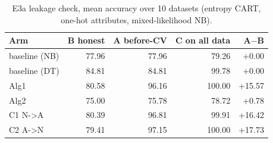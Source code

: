 \begin{table}[t]
\caption{E3a leakage check, mean accuracy over 10 datasets (entropy CART, one-hot attributes, mixed-likelihood NB).}
\label{tab:e3a}
\centering\small
\setlength{\tabcolsep}{3pt}
\begin{tabular}{lrrrr}
\toprule
Arm & B honest & A before-CV & C on all data & A$-$B \\
\midrule
baseline (NB) & 77.96 & 77.96 & 79.26 & +0.00 \\
baseline (DT) & 84.81 & 84.81 & 99.78 & +0.00 \\
Alg1 & 80.58 & 96.16 & 100.00 & +15.57 \\
Alg2 & 75.00 & 75.78 & 78.72 & +0.78 \\
C1 N->A & 80.39 & 96.81 & 99.91 & +16.42 \\
C2 A->N & 79.41 & 97.15 & 100.00 & +17.73 \\
\bottomrule
\end{tabular}
\end{table}
